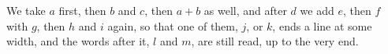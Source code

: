 We take $a$ first, then $b$ and $c$, then $a+b$ as well, and after $d$ we add
$e$, then $f$ with $g$, then $h$ and $i$ again, so that one of them, $j$, or
$k$, ends a line at some width, and the words after it, $l$ and $m$, are
still read, up to the very end.
